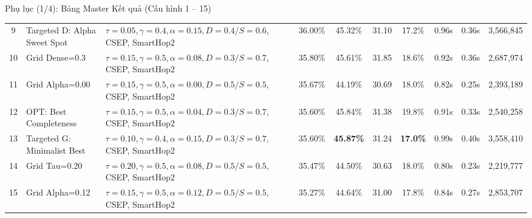 \documentclass[aspectratio=169,10pt]{beamer}
\begin{document}
\begin{frame}{Phụ lục (1/4): Bảng Master Kết quả (Cấu hình 1 -- 15)}
{\begin{tabular}{c l l ccccccc}
9 & Targeted D: Alpha Sweet Spot & $\tau=0.05, \gamma=0.4, \alpha=0.15, D=0.4/S=0.6$, CSEP, SmartHop2 & 36.00\% & 45.32\% & 31.10 & 17.2\% & 0.96s & 0.36s & 3,566,845 \\
10 & Grid Dense=0.3 & $\tau=0.15, \gamma=0.5, \alpha=0.08, D=0.3/S=0.7$, CSEP, SmartHop2 & 35.80\% & 45.61\% & 31.85 & 18.6\% & 0.92s & 0.36s & 2,687,974 \\
11 & Grid Alpha=0.00 & $\tau=0.15, \gamma=0.5, \alpha=0.00, D=0.5/S=0.5$, CSEP, SmartHop2 & 35.67\% & 44.19\% & 30.69 & 18.0\% & 0.82s & 0.25s & 2,393,189 \\
12 & OPT: Best Completeness & $\tau=0.15, \gamma=0.5, \alpha=0.04, D=0.3/S=0.7$, CSEP, SmartHop2 & 35.60\% & 45.84\% & 31.38 & 19.8\% & 0.91s & 0.33s & 2,540,258 \\
13 & Targeted G: Minimalist Best & $\tau=0.10, \gamma=0.4, \alpha=0.15, D=0.3/S=0.7$, CSEP, SmartHop2 & 35.60\% & \textbf{45.87\%} & 31.24 & \textbf{17.0\%} & 0.99s & 0.40s & 3,558,410 \\
14 & Grid Tau=0.20 & $\tau=0.20, \gamma=0.5, \alpha=0.08, D=0.5/S=0.5$, CSEP, SmartHop2 & 35.47\% & 44.50\% & 30.63 & 18.0\% & 0.80s & 0.23s & 2,219,777 \\
15 & Grid Alpha=0.12 & $\tau=0.15, \gamma=0.5, \alpha=0.12, D=0.5/S=0.5$, CSEP, SmartHop2 & 35.27\% & 44.64\% & 31.00 & 17.8\% & 0.84s & 0.27s & 2,853,707 \\
\bottomrule
\end{tabular}
}
\end{frame}
\end{document}
